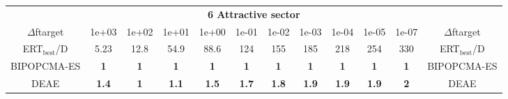 \begin{tabular}{cccccccccccc}
 & \multicolumn{10}{c}{{\normalsize \textbf{6 Attractive sector}}}\\
$\Delta$ftarget& 1e+03& 1e+02& 1e+01& 1e+00& 1e-01& 1e-02& 1e-03& 1e-04& 1e-05& 1e-07 & $\Delta$ftarget \\
ERT$_{\textrm{best}}$/D& 5.23& 12.8& 54.9& 88.6& 124& 155& 185& 218& 254& 330 & ERT$_{\textrm{best}}$/D \\
\hline
BIPOPCMA-ES & \textbf{1} & \textbf{1} & \textbf{1} & \textbf{1} & \textbf{1} & \textbf{1} & \textbf{1} & \textbf{1} & \textbf{1} & \textbf{1} & BIPOPCMA-ES \cite{add_an_entry_for_BIPOPCMA-ES_in_bbob.bib}\\
DEAE & \textbf{1.4} & \textbf{1} & \textbf{1.1} & \textbf{1.5} & \textbf{1.7} & \textbf{1.8} & \textbf{1.9} & \textbf{1.9} & \textbf{1.9} & \textbf{2} & DEAE \cite{add_an_entry_for_DEAE_in_bbob.bib}
\end{tabular}
